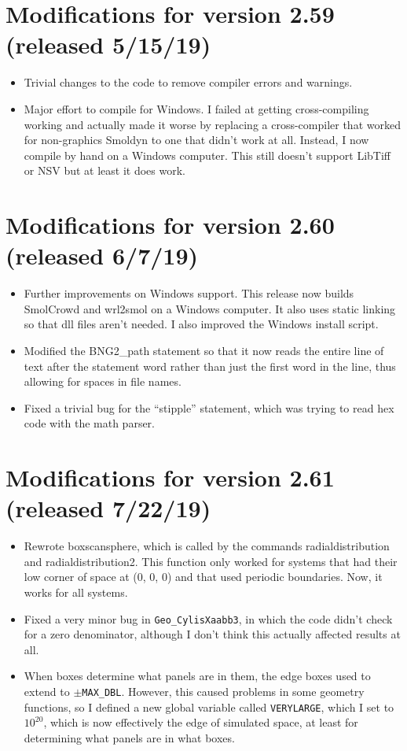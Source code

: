 \documentclass {scrbook}
\newcommand {\ttt} {\texttt}
\begin{document}
\section{Modifications for version 2.59 (released 5/15/19)}
\begin{itemize}
\item Trivial changes to the code to remove compiler errors and warnings.
\item Major effort to compile for Windows. I failed at getting cross-compiling working and actually made it worse by replacing a cross-compiler that worked for non-graphics Smoldyn to one that didn't work at all. Instead, I now compile by hand on a Windows computer. This still doesn't support LibTiff or NSV but at least it does work.
\end{itemize}

\section{Modifications for version 2.60 (released 6/7/19)}
\begin{itemize}
\item Further improvements on Windows support. This release now builds SmolCrowd and wrl2smol on a Windows computer. It also uses static linking so that dll files aren't needed. I also improved the Windows install script.
\item Modified the BNG2\_path statement so that it now reads the entire line of text after the statement word rather than just the first word in the line, thus allowing for spaces in file names.
\item Fixed a trivial bug for the ``stipple'' statement, which was trying to read hex code with the math parser.
\end{itemize}

\section{Modifications for version 2.61 (released 7/22/19)}
\begin{itemize}
\item Rewrote boxscansphere, which is called by the commands radialdistribution and radialdistribution2. This function only worked for systems that had their low corner of space at (0, 0, 0) and that used periodic boundaries. Now, it works for all systems.
\item Fixed a very minor bug in \ttt{Geo\_CylisXaabb3}, in which the code didn't check for a zero denominator, although I don't think this actually affected results at all.
\item When boxes determine what panels are in them, the edge boxes used to extend to $\pm$\ttt{MAX\_DBL}. However, this caused problems in some geometry functions, so I defined a new global variable called \ttt{VERYLARGE}, which I set to $10^{20}$, which is now effectively the edge of simulated space, at least for determining what panels are in what boxes.
\end{itemize}
\end{document}
